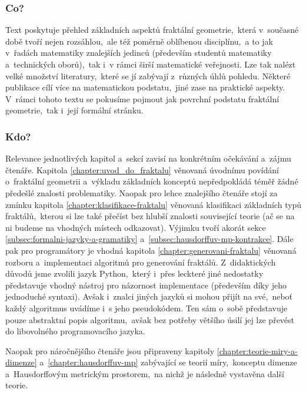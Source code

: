 \label{chapter:predmluva}

\subsubsection{Co?}

Text poskytuje přehled základních aspektů fraktální geometrie,~která v~současné době tvoří nejen rozsáhlou,~ale též poměrně oblíbenou disciplínu,~a to jak v~řadách matematiky znalejších jedinců (především studentů matematiky a~technických oborů),~tak i~v rámci širší matematické veřejnosti. Lze tak nalézt velké množství literatury,~které se jí zabývají z~různých úhlů pohledu. Některé publikace cílí více na matematickou podstatu,~jiné zase na praktické aspekty. V~rámci tohoto textu se pokusíme pojmout jak povrchní podstatu fraktální geometrie,~tak i~její formální stránku.

\subsubsection{Kdo?}

Relevance jednotlivých kapitol a~sekcí zavisí na konkrétním očekávání a~zájmu čtenáře. Kapitola \ref{chapter:uvod_do_fraktalu} věnovaná úvodnímu povídání o~fraktální geometrii a~výkladu základních konceptů nepředpokládá téměř žádné předešlé znalosti problematiky. Naopak pro lehce znalejšího čtenáře stojí za zmínku kapitola \ref{chapter:klasifikace-fraktalu} věnovaná klasifikaci základních typů fraktálů,~kterou si lze také přečíst bez hlubší znalosti související teorie (ač se na ni budeme na vhodných místech odkazovat). Výjimku tvoří akorát sekce \ref{subsec:formalni-jazyky-a-gramatiky} a~\ref{subsec:hausdorffuv-mp-kontrakce}. Dále pak pro programátory je vhodná kapitola \ref{chapter:generovani-fraktalu} věnovaná rozboru a~implementaci algoritmů pro generování fraktálů. Z~didaktických důvodů jsme zvolili jazyk Python,~který i~přes leckteré jiné nedostatky představuje vhodný nástroj pro názornost implementace (především díky jeho jednoduché syntaxi). Avšak i~znalci jiných jazyků si mohou přijít na své,~neboť každý algoritmus uvádíme i~s jeho pseudokódem. Ten sám o~sobě představuje pouze abstraktní popis algoritmu,~avšak bez potřeby většího úsilí jej lze převést do libovolného programovacího jazyka.

Naopak pro náročnějšího čtenáře jsou připraveny kapitoly \ref{chapter:teorie-miry-a-dimenze} a~\ref{chapter:hausdorffuv-mp} zabývající se teorií míry,~konceptu dimenze a~Hausdorffovým metrickým prostorem,~na nichž je následně vystavěna další teorie.


